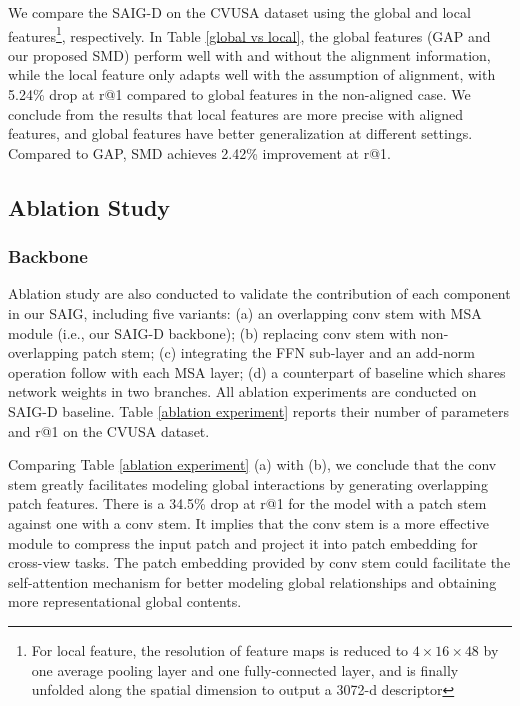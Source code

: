 \documentclass[sn-basic,iicol]{sn-jnl}
\theoremstyle{thmstyletwo}\newtheorem{example}{Example}\newtheorem{remark}{Remark}
\theoremstyle{thmstylethree}\newtheorem{definition}{Definition}
\begin{document}
 We compare the SAIG-D on the CVUSA dataset using the global and local features\footnote{For local feature, the resolution of feature maps is reduced to $4\times16\times48$ by one average pooling layer and one fully-connected layer, and is finally unfolded along the spatial dimension to output a 3072-d descriptor}, respectively. In Table \ref{global vs local}, the global features (GAP and our proposed SMD) perform well with and without the alignment information, while the local feature only adapts well with the assumption of alignment, with 5.24\% drop at r@1 compared to global features in the non-aligned case. We conclude from the results that local features are more precise with aligned features, and global features have better generalization at different settings. Compared to GAP, SMD achieves 2.42\% improvement at r@1.






\subsection{Ablation Study}





\subsubsection{Backbone} Ablation study are also conducted to validate the contribution of each component in our SAIG, including five variants: (a) an overlapping conv stem with MSA module (i.e., our SAIG-D backbone); (b) replacing conv stem with non-overlapping patch stem; (c) integrating the FFN sub-layer and an add-norm operation follow with each MSA layer; (d) a counterpart of baseline which shares network weights in two branches. 
All ablation experiments are conducted on SAIG-D baseline. Table \ref{ablation experiment} reports their number of parameters and r@1 on the CVUSA dataset.

 Comparing Table \ref{ablation experiment} (a) with (b), we conclude that the conv stem greatly facilitates modeling global interactions by generating overlapping patch features. There is a 34.5\% drop at r@1 for the model with a patch stem against one with a conv stem. It implies that the conv stem is a more effective module to compress the input patch and project it into patch embedding for cross-view tasks. The patch embedding provided by conv stem could facilitate the self-attention mechanism for better modeling global relationships and obtaining more representational global contents. 
\end{document}
